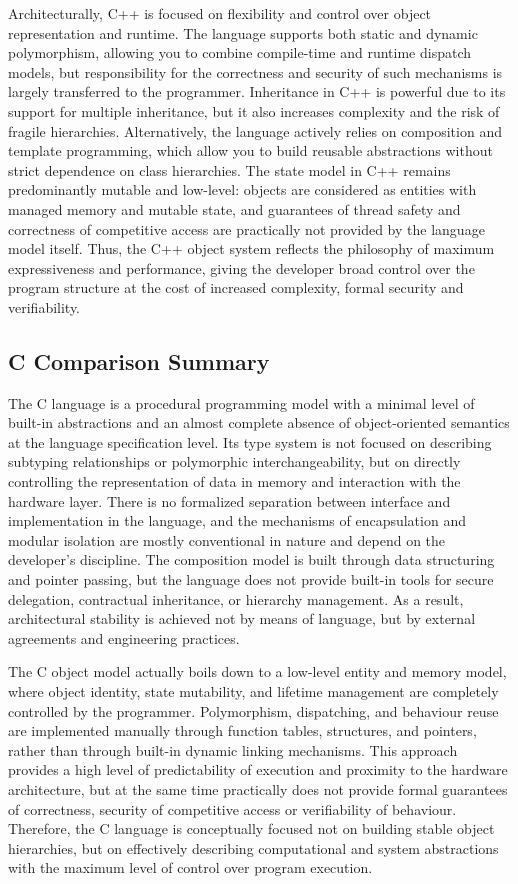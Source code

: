 Architecturally, C++ is focused on flexibility and control over object representation and runtime. The language supports both static and dynamic polymorphism, allowing you to combine compile-time and runtime dispatch models, but responsibility for the correctness and security of such mechanisms is largely transferred to the programmer. Inheritance in C++ is powerful due to its support for multiple inheritance, but it also increases complexity and the risk of fragile hierarchies. Alternatively, the language actively relies on composition and template programming, which allow you to build reusable abstractions without strict dependence on class hierarchies. The state model in C++ remains predominantly mutable and low-level: objects are considered as entities with managed memory and mutable state, and guarantees of thread safety and correctness of competitive access are practically not provided by the language model itself. Thus, the C++ object system reflects the philosophy of maximum expressiveness and performance, giving the developer broad control over the program structure at the cost of increased complexity, formal security and verifiability.


\subsection{C Comparison Summary}

The C language is a procedural programming model with a minimal level of built-in abstractions and an almost complete absence of object-oriented semantics at the language specification level. Its type system is not focused on describing subtyping relationships or polymorphic interchangeability, but on directly controlling the representation of data in memory and interaction with the hardware layer. There is no formalized separation between interface and implementation in the language, and the mechanisms of encapsulation and modular isolation are mostly conventional in nature and depend on the developer's discipline. The composition model is built through data structuring and pointer passing, but the language does not provide built-in tools for secure delegation, contractual inheritance, or hierarchy management. As a result, architectural stability is achieved not by means of language, but by external agreements and engineering practices.

The C object model actually boils down to a low-level entity and memory model, where object identity, state mutability, and lifetime management are completely controlled by the programmer. Polymorphism, dispatching, and behaviour reuse are implemented manually through function tables, structures, and pointers, rather than through built-in dynamic linking mechanisms. This approach provides a high level of predictability of execution and proximity to the hardware architecture, but at the same time practically does not provide formal guarantees of correctness, security of competitive access or verifiability of behaviour. Therefore, the C language is conceptually focused not on building stable object hierarchies, but on effectively describing computational and system abstractions with the maximum level of control over program execution.

